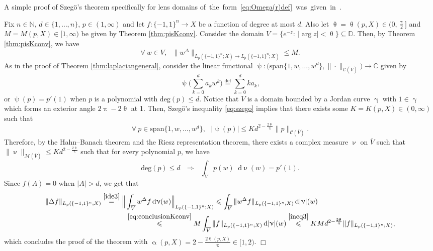 \documentclass[11pt,reqno]{amsart}
\renewcommand{\leq}{\leqslant}
\renewcommand{\gamma}{\upgamma}
\renewcommand{\pi}{\uppi}
\newcommand{\1}{\mathbf 1}
\theoremstyle{remark}
\newcommand{\C}{\mathbb C}
\newcommand{\N}{\mathbb N}
\newcommand{\eqdef}{\stackrel{\mathrm{def}}{=}}
\renewcommand{\theta}{\uptheta}
\renewcommand{\gamma}{\upgamma}
\renewcommand{\alpha}{\upalpha}
\renewcommand{\psi}{\uppsi}
\renewcommand{\pi}{\uppi}
\renewcommand{\nu}{\upnu}
\renewcommand{\pi}{\uppi}
\newcommand{\mb}{\mathbb}
\newcommand*\diff{\mathop{}\!\mathrm{d}}
\newcommand{\ms}{\mathscr}
\begin{document}
\noindent A simple proof of Szeg\"o's theorem specifically for lens domains of\mbox{ the form \eqref{eq:Omega(r)def} was given in \cite{EI18}.}

\medskip

 Fix $n\in\N$, $d\in\{1,\ldots,n\}$, $p\in(1,\infty)$ and let $f:\{-1,1\}^n\to X$ be a function of degree at most $d$. Also let $\theta=\theta(p,X)\in\big(0,\frac{\pi}{2}\big]$ and $M=M(p,X)\in[1,\infty)$ be given by Theorem \ref{thm:pisKconv}. Consider the domain $V = \{ e^{-z}: \ |\arg z|<\theta\} \subseteq\mb{D}$. Then, by Theorem \ref{thm:pisKconv}, we have
\begin{equation} \label{eq:usecomplexdomain}
\forall \ w\in V, \ \ \ \|w^\Delta\|_{{L_p(\{-1,1\}^n;X)}\to {L_p(\{-1,1\}^n;X)}} \leq M.
\end{equation}
As in the proof of Theorem \ref{thm:laplaciangeneral}, consider the linear functional $\psi:\big(\mathrm{span}\{1,w,\ldots,w^d\}, \|\cdot\|_{\ms{C}(\overline{V})}\big)\to \C$ given by
\begin{equation}
\psi\Big( \sum_{k=0}^d a_k w^k\Big) \eqdef \sum_{k=0}^d ka_k,
\end{equation}
or $\psi(p) = p'(1)$ when $p$ is a polynomial with $\mathrm{deg}(p)\leq d$. Notice that $V$ is a   domain bounded by a Jordan curve $\gamma$ with $1\in\gamma$ which forms an exterior angle $2\pi-2\theta$ at 1. Then, Szeg\"o's inequality \eqref{eq:szego} implies that there exists some $K=K(p,X)\in(0,\infty)$ such that
\begin{equation} \label{ineq3}
\forall \ p\in\mathrm{span}\{1,w,\ldots,w^d\}, \ \ \ |\psi(p)| \leq K d^{2-\frac{2\theta}{\pi}} \|p\|_{\ms{C}(\overline{V})}.
\end{equation}
Therefore, by the Hahn--Banach theorem and the Riesz representation theorem, there exists a complex measure $\nu$ on $\overline{V}$ such that $\|\nu\|_{\ms{M}(\overline{V})} \leq K d^{2-\frac{2\theta}{\pi}}$ such that for every polynomial $p$, we have
\begin{equation} \label{ide3}
\mathrm{deg}(p)\leq d \ \ \ \Longrightarrow \ \ \ \int_{\overline{V}} p(w)\diff\nu(w) = p'(1).
\end{equation}
Since $\widehat{f}(A)=0$ when $|A|>d$, we get that
\begin{equation}
\begin{split}
 \|\Delta f\|_{L_p(\{-1,1\}^n;X)}  \stackrel{\eqref{ide3}}{=} \Big\|& \int_{\overline{V}} w^\Delta f \diff\nu(w)\Big\|_{L_p(\{-1,1\}^n;X)} \leq \int_{\overline{V}} \|w^\Delta f\|_{L_p(\{-1,1\}^n;X)} \diff|\nu|(w) 
\\ & \stackrel{\eqref{eq:conclusionKconv}}{\leq} M \int_{\overline{V}} \|f\|_{L_p(\{-1,1\}^n;X)} \diff|\nu|(w) \stackrel{\eqref{ineq3}}{\leq} KM d^{2-\frac{2\theta}{\pi}} \|f\|_{L_p(\{-1,1\}^n;X)},
\end{split}
\end{equation}
which concludes the proof of the theorem with $\alpha(p,X) = 2-\frac{2\theta(p,X)}{\pi} \in [1,2)$.
\hfill$\Box$
\end{document}
